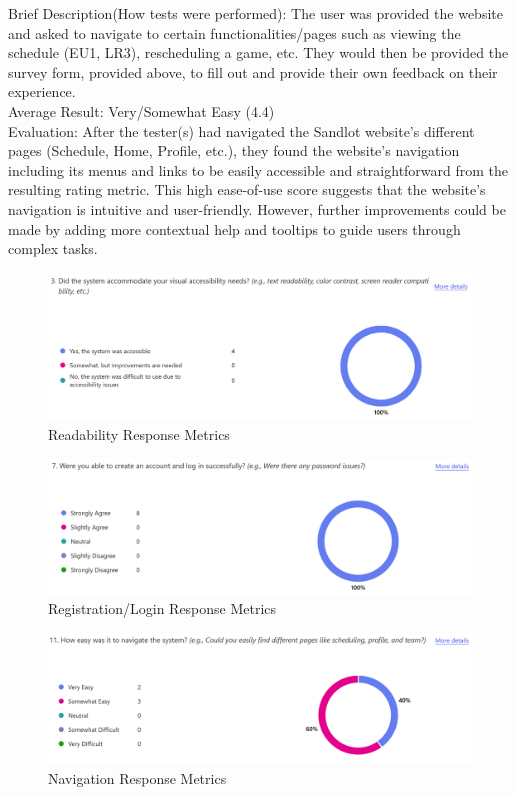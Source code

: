 \documentclass[12pt, titlepage]{article}
\begin{document}
\begin{enumerate}
  Brief Description(How tests were performed): The user was provided the website and asked
  to navigate to certain functionalities/pages such as viewing the schedule (EU1, LR3),
  rescheduling a game, etc. They would then be provided the survey form, provided above, to fill
  out and provide their own feedback on their experience. \\
  Average Result: Very/Somewhat Easy (4.4)\\
  Evaluation: After the tester(s) had navigated the Sandlot website's different pages
  (Schedule, Home, Profile, etc.), they found the website's navigation including
  its menus and links to be easily accessible and straightforward from the resulting
  rating metric. This high ease-of-use score suggests that the website's navigation is intuitive
  and user-friendly. However, further improvements could be made by adding more contextual help
  and tooltips to guide users through complex tasks.
\end{enumerate}

\begin{figure}[H]
\centering
\includegraphics[scale=0.6]{survey_responses_visual.png}
\caption{Readability Response Metrics}
\label{visual}
\end{figure}

\begin{figure}[H]
\centering
\includegraphics[scale=0.6]{survey_responses_register_signin.png}
\caption{Registration/Login Response Metrics}
\label{account}
\end{figure}

\begin{figure}[H]
\centering
\includegraphics[scale=0.6]{survey_responses_navigation.png}
\caption{Navigation Response Metrics}
\label{nav}
\end{figure}
		
\end{document}

